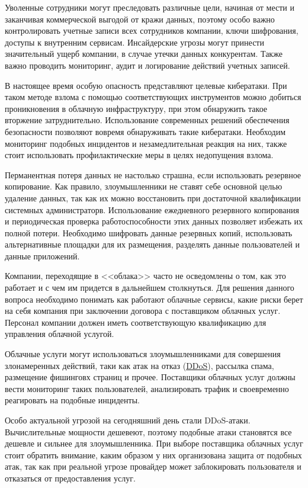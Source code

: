 Уволенные сотрудники могут преследовать различные цели, начиная от мести и заканчивая коммерческой выгодой от кражи данных, поэтому особо важно контролировать учетные записи всех сотрудников компании, ключи шифрования, доступы к внутренним сервисам.
Инсайдерские угрозы могут принести значительный ущерб компании, в случае утечки данных конкурентам.
Также важно проводить мониторинг, аудит и логирование действий учетных записей.

В настоящее время особую опасность представляют целевые кибератаки.
При таком методе взлома с помощью соответствующих инструментов можно добиться проникновения в облачную инфраструктуру, при этом обнаружить такое вторжение затруднительно.
Использование современных решений обеспечения безопасности позволяют вовремя обнаруживать такие кибератаки.
Необходим мониторинг подобных инцидентов и незамедлительная реакция на них, также стоит использовать профилактические меры в целях недопущения взлома.

Перманентная потеря данных не настолько страшна, если использовать резервное копирование.
Как правило, злоумышленники не ставят себе основной целью удаление данных, так как их можно восстановить при достаточной квалификации системных администраторв.
Использование ежедневного резервного копирования и периодическая проверка работоспособности этих данных позволяет избежать их полной потери.
Необходимо шифровать данные резервных копий, использовать альтернативные площадки для их размещения, разделять данные пользователей и данные приложений.

Компании, переходящие в <<облака>> часто не осведомлены о том, как это работает и с чем им придется в дальнейшем столкнуться.
Для решения данного вопроса необходимо понимать как работают облачные сервисы, какие риски берет на себя компания при заключении договора с поставщиком облачных услуг.
Персонал компании должен иметь соответствующую квалификацию для управления облачной услугой.

Облачные услуги могут использоваться злоумышленниками для совершения злонамеренных действий, таки как атак на отказ (\hyperlink{ddos}{DDoS}), рассылка спама, размещение фишинговх страниц и прочее.
Поставщики облачных услуг должны вести мониторинг таких пользователей, анализировать трафик и своевременно реагировать на подобные инциденты.

Особо актуальной угрозой на сегодняшний день стали DDoS-атаки.
Вычислительные мощности дешевеют, поэтому подобные атаки становятся все дешевле и сильнее для злоумышленника.
При выборе поставщика облачных услуг стоит обратить внимание, каким образом у них организована защита от подобных атак, так как при реальной угрозе провайдер может заблокировать пользователя и отказаться от предоставления услуг.

